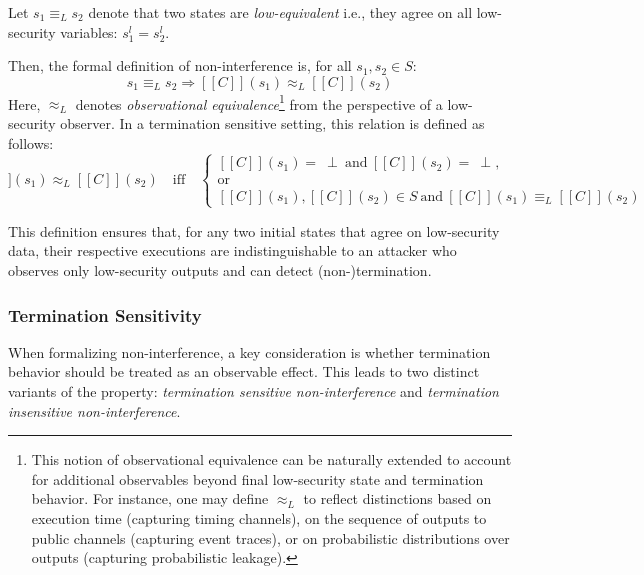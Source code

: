 \documentclass[12pt,a4paper,twoside]{book}
\newcommand{\llbracket}{[\![}
\newcommand{\rrbracket}{]\!]}
\begin{document}
Let $s_1 \equiv_L s_2$ denote that two states are \emph{low-equivalent} i.e., they agree on all low-security variables: $s_1^l = s_2^l$.

Then, the formal definition of non-interference is\cite{volpano1996sound}\cite{goguen1982security}, for all $s_1, s_2 \in S$:
\[
  s_1 \equiv_L s_2 \Rightarrow \llbracket C \rrbracket(s_1) \approx_L \llbracket C \rrbracket(s_2)
\]
Here, \(\approx_L\) denotes \emph{observational equivalence}\footnote{This notion of observational equivalence can be naturally extended to account for additional observables beyond final low-security state and termination behavior\cite{sabelfeld2003language}. For instance, one may define \(\approx_L\) to reflect distinctions based on execution time (capturing timing channels), on the sequence of outputs to public channels (capturing event traces), or on probabilistic distributions over outputs (capturing probabilistic leakage).} from the perspective of a low-security observer. In a termination sensitive setting\cite{hedin2012perspective}, this relation is defined as follows:
\begin{equation}
\llbracket C \rrbracket(s_1) \approx_L \llbracket C \rrbracket(s_2)
\quad\text{iff}\quad
\begin{cases}
\llbracket C \rrbracket(s_1) =\ \perp \ \text{and}\ \llbracket C \rrbracket(s_2) =\ \perp, \\
\text{or} \\
\llbracket C \rrbracket(s_1), \llbracket C \rrbracket(s_2) \in S \ \text{and}\
\llbracket C \rrbracket(s_1) \equiv_L \llbracket C \rrbracket(s_2)
\end{cases}
\label{eq:approx_tsni}
\end{equation}


This definition ensures that, for any two initial states that agree on low-security data, their respective executions are indistinguishable to an attacker who observes only low-security outputs and can detect (non-)termination.

\subsubsection{Termination Sensitivity}
When formalizing non-interference, a key consideration is whether termination behavior should be treated as an observable effect\cite{hedin2012perspective}. This leads to two distinct variants of the property: \emph{termination sensitive non-interference} and \emph{termination insensitive non-interference}.
\end{document}
